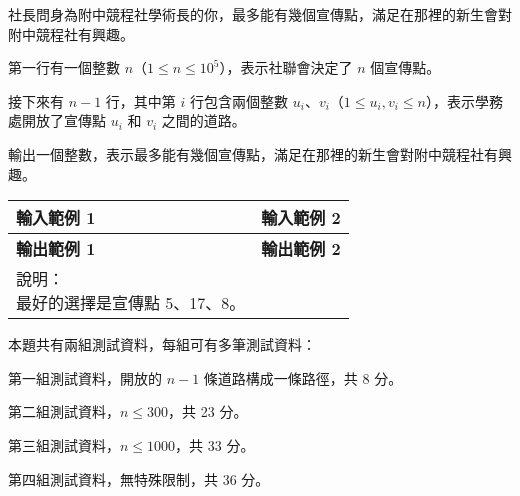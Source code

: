 \documentclass[12pt]{article}
\begin{document}
社長問身為附中競程社學術長的你，最多能有幾個宣傳點，滿足在那裡的新生會對附中競程社有興趣。

\clearpage


第一行有一個整數 $n$（$1 \leq n \leq 10^5$），表示社聯會決定了 $n$ 個宣傳點。

接下來有 $n-1$ 行，其中第 $i$ 行包含兩個整數 $u_i$、$v_i$（$1 \leq u_i,v_i \leq n$），表示學務處開放了宣傳點 $u_i$ 和 $v_i$ 之間的道路。


輸出一個整數，表示最多能有幾個宣傳點，滿足在那裡的新生會對附中競程社有興趣。

\begin{tabularx}{\linewidth}{|X|X|}
    \hline
    \makecell[lt]{
        \textbf{輸入範例 1}\\
        
    } &
    \makecell[lt]{
        \textbf{輸入範例 2}\\
        
    } \\ \hline
    \makecell[lt]{
        \textbf{輸出範例 1}\\
        
    } & 
    \makecell[lt]{
        \textbf{輸出範例 2}\\
        
    } \\ \hline
    \makecell[lt]{
        說明：\\
        最好的選擇是宣傳點 5、17、8。
    } & \\ \hline
\end{tabularx}


本題共有兩組測試資料，每組可有多筆測試資料：

第一組測試資料，開放的 $n-1$ 條道路構成一條路徑，共 8 分。

第二組測試資料，$n \leq 300$，共 23 分。

第三組測試資料，$n \leq 1000$，共 33 分。

第四組測試資料，無特殊限制，共 36 分。
\end{document}
